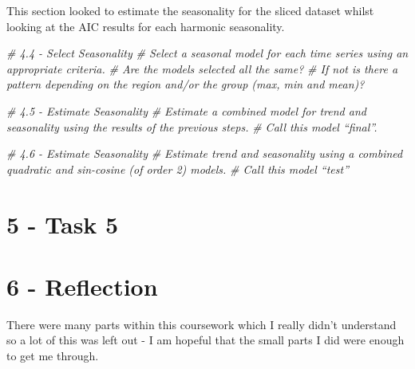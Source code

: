 \documentclass[
]{article}
\newenvironment{Shaded}{\begin{snugshade}}{\end{snugshade}}
\newcommand{\CommentTok}[1]{\textcolor[rgb]{0.56,0.35,0.01}{\textit{#1}}}
\begin{document}
This section looked to estimate the seasonality for the sliced dataset
whilst looking at the AIC results for each harmonic seasonality.

\begin{Shaded}
\begin{Highlighting}[]
\CommentTok{\# 4.4 {-} Select Seasonality}
\CommentTok{\# Select a seasonal model for each time series using an appropriate criteria.}
\CommentTok{\# Are the models selected all the same? }
\CommentTok{\# If not is there a pattern depending on the region and/or the group (max, min and mean)?}


\CommentTok{\# 4.5 {-} Estimate Seasonality}
\CommentTok{\# Estimate a combined model for trend and seasonality using the results of the previous steps.}
\CommentTok{\# Call this model “final”.}




\CommentTok{\# 4.6 {-} Estimate Seasonality}
\CommentTok{\# Estimate trend and seasonality using a combined quadratic and sin{-}cosine (of order 2) models.}
\CommentTok{\# Call this model “test”}
\end{Highlighting}
\end{Shaded}

\hypertarget{task-5}{%
\section{5 - Task 5}\label{task-5}}

\hypertarget{reflection}{%
\section{6 - Reflection}\label{reflection}}

There were many parts within this coursework which I really didn't
understand so a lot of this was left out - I am hopeful that the small
parts I did were enough to get me through.
\end{document}
